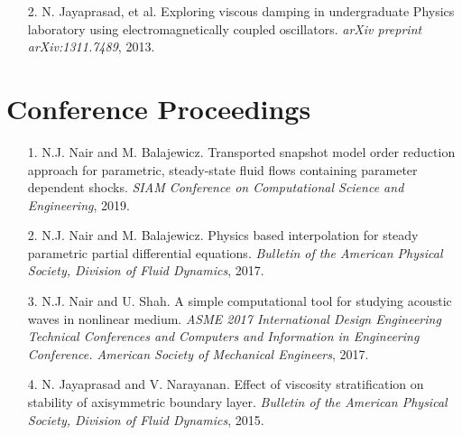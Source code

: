\documentclass[margin]{res}
\begin{document}
\begin{resume}
\begin{itemize}
  \item[2.] N. Jayaprasad, et al. Exploring viscous damping in undergraduate Physics laboratory using electromagnetically coupled oscillators. \textit{arXiv preprint arXiv:1311.7489}, 2013.
 \end{itemize}
 
 \section{\large Conference Proceedings}
 \begin{itemize}
 
 \item[1. ] N.J. Nair and M. Balajewicz. Transported snapshot model order reduction approach for parametric, steady-state fluid flows containing parameter dependent shocks. \textit{SIAM Conference on Computational Science and Engineering}, 2019.\\
 
 \item[2.] N.J. Nair and M. Balajewicz. Physics based interpolation for steady parametric partial differential equations. \textit{Bulletin of the American Physical Society, Division of Fluid Dynamics}, 2017.\\
 
 \item[3.] N.J. Nair and U. Shah. A simple computational tool for studying acoustic waves in nonlinear medium. \textit{ASME 2017 International Design Engineering Technical Conferences and Computers and Information in Engineering Conference. American Society of Mechanical Engineers}, 2017.\\
 
 \item[4.] N. Jayaprasad and V. Narayanan. Effect of viscosity stratification on stability of axisymmetric boundary layer. \textit{Bulletin of the American Physical Society, Division of Fluid Dynamics}, 2015.
  
 \end{itemize}
		 

\end{resume}
\end{document}

